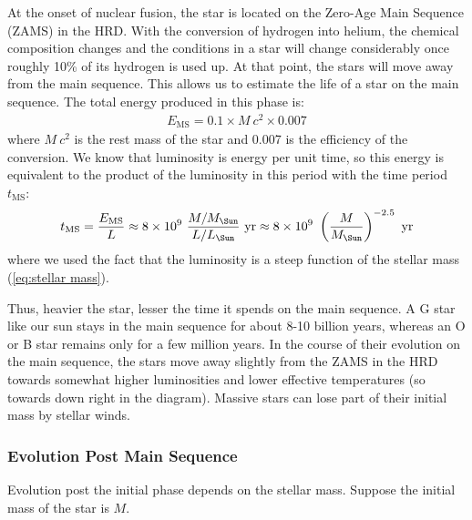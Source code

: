 \documentclass[a4paper,11pt]{report}
\newcommand{\MS}{M_\text{\Sun}}
\newcommand{\LS}{L_\text{\Sun}}
\begin{document}
At the onset of nuclear fusion, the star is located on the Zero-Age Main Sequence (ZAMS) in the HRD. With the conversion of hydrogen into helium, the chemical composition changes and the conditions in a star will change considerably once roughly 10\% of its hydrogen is used up. At that point, the stars will move away from the main sequence. This allows us to estimate the life of a star on the main sequence. The total energy produced in this phase is:
\begin{align*}
  E_\text{MS} = 0.1 \times M \ c^2 \times 0.007
\end{align*}
where $M \ c^2$ is the rest mass of the star and 0.007 is the efficiency of the conversion. We know that luminosity is energy per unit time, so this energy is equivalent to the product of the luminosity in this period with the time period $t_\text{MS}$:
\begin{align*}
  t_\text{MS} = \frac{E_\text{MS}}{L} \approx 8 \times 10^9 \ \frac{M/\MS}{L/\LS} \text{ yr} \approx 8 \times 10^9 \ \left( \frac{M}{\MS} \right)^{-2.5} \text{ yr}
\end{align*}
where we used the fact that the luminosity is a steep function of the stellar mass (\ref{eq:stellar mass}).

\vspace{1em}

Thus, heavier the star, lesser the time it spends on the main sequence. A G star like our sun stays in the main sequence for about 8-10 billion years, whereas an O or B star remains only for a few million years. In the course of their evolution on the main sequence, the stars move away slightly from the ZAMS in the HRD towards somewhat higher luminosities and lower effective temperatures (so towards down right in the diagram). Massive stars can lose part of their initial mass by stellar winds.

\subsubsection{Evolution Post Main Sequence}
Evolution post the initial phase depends on the stellar mass. Suppose the initial mass of the star is $M$.
\end{document}
